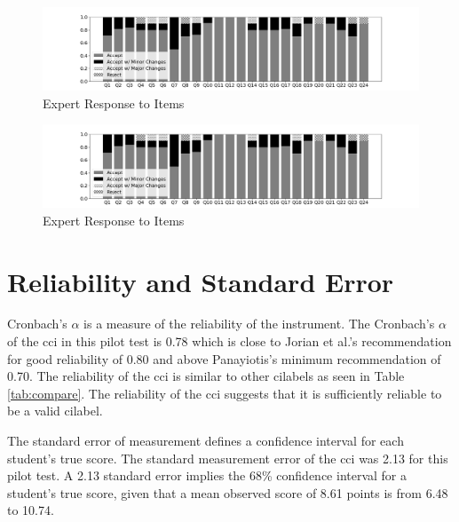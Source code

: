 \iflong
\begin{figure}[!htbp]
    \begin{center}
    \advance\leftskip-3cm
    \advance\rightskip-3cm
    \includegraphics[scale=.4]{images/bar.png}
    \caption{Expert Response to Items}
    \label{fig:accept_rej}
\end{center}
\end{figure}
\fi

\ifshort
\begin{figure}[!htbp]
    \begin{center}
    \advance\leftskip-3cm
    \advance\rightskip-3cm
    \includegraphics[scale=.3]{images/bar.png}
    \caption{Expert Response to Items}
    \label{fig:accept_rej}
\end{center}
\end{figure}
\fi

\FloatBarrier
\section{Reliability and Standard Error}

Cronbach's $\alpha$ is a measure of the reliability of the instrument. The Cronbach's $\alpha$ of the \gls{cci} in this pilot test is 0.78 which is close to Jorian et al.'s recommendation for good reliability of 0.80 and above Panayiotis's minimum recommendation of 0.70. The reliability of the \gls{cci} is similar to other \glspl{cilabel} as seen in Table \ref{tab:compare}. The reliability of the \gls{cci} suggests that it is sufficiently reliable to be a valid \gls{cilabel}.   


The standard error of measurement defines a confidence interval for each student's true score. The standard measurement error of the \gls{cci} was 2.13 for this pilot test. A 2.13 standard error implies the 68\% confidence interval for a student’s true score, given that a mean observed score of 8.61 points is from 6.48 to 10.74. 

